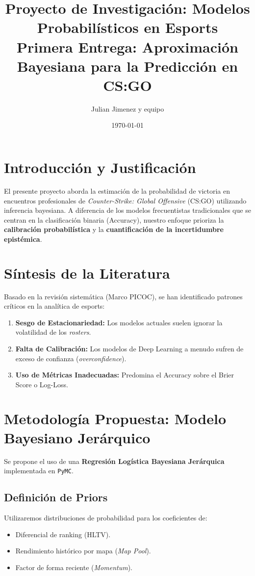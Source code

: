 \documentclass[12pt,a4paper]{article}
\title{\textbf{Proyecto de Investigación: Modelos Probabilísticos en Esports}\\ 
\Large Primera Entrega: Aproximación Bayesiana para la Predicción en CS:GO}
\author{Julian Jimenez y equipo}
\date{\today}
\begin{document}
\maketitle

\section{Introducción y Justificación}
El presente proyecto aborda la estimación de la probabilidad de victoria en encuentros profesionales de \textit{Counter-Strike: Global Offensive} (CS:GO) utilizando inferencia bayesiana. A diferencia de los modelos frecuentistas tradicionales que se centran en la clasificación binaria (Accuracy), nuestro enfoque prioriza la \textbf{calibración probabilística} y la \textbf{cuantificación de la incertidumbre epistémica}.

\section{Síntesis de la Literatura}
Basado en la revisión sistemática (Marco PICOC), se han identificado patrones críticos en la analítica de esports:
\begin{enumerate}
    \item \textbf{Sesgo de Estacionariedad:} Los modelos actuales suelen ignorar la volatilidad de los \textit{rosters}.
    \item \textbf{Falta de Calibración:} Los modelos de Deep Learning a menudo sufren de exceso de confianza (\textit{overconfidence}).
    \item \textbf{Uso de Métricas Inadecuadas:} Predomina el Accuracy sobre el Brier Score o Log-Loss.
\end{enumerate}

\section{Metodología Propuesta: Modelo Bayesiano Jerárquico}
Se propone el uso de una \textbf{Regresión Logística Bayesiana Jerárquica} implementada en \texttt{PyMC}.

\subsection{Definición de Priors}
Utilizaremos distribuciones de probabilidad para los coeficientes de:
\begin{itemize}
    \item Diferencial de ranking (HLTV).
    \item Rendimiento histórico por mapa (\textit{Map Pool}).
    \item Factor de forma reciente (\textit{Momentum}).
\end{itemize}
\end{document}
